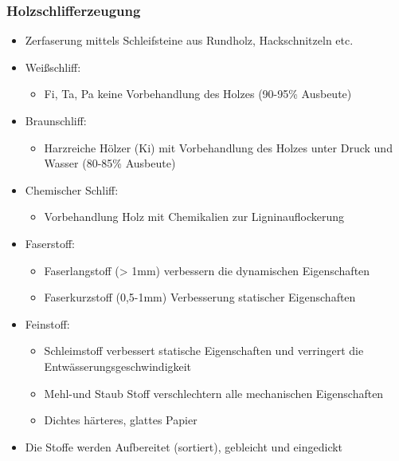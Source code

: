 \documentclass{article}
\begin{document}
\subsubsection{Holzschlifferzeugung}
\begin{itemize}
  \item Zerfaserung mittels Schleifsteine aus Rundholz, Hackschnitzeln etc.
  \item Weißschliff:
  \begin{itemize}
    \item Fi, Ta, Pa keine Vorbehandlung des Holzes (90-95\% Ausbeute)
  \end{itemize}
  \item Braunschliff:
  \begin{itemize}
    \item Harzreiche Hölzer (Ki) mit Vorbehandlung des Holzes unter Druck und
    Wasser (80-85\% Ausbeute)
  \end{itemize}
  \item Chemischer Schliff:
  \begin{itemize}
    \item Vorbehandlung Holz mit Chemikalien zur Ligninauflockerung
  \end{itemize}
  \item Faserstoff:
  \begin{itemize}
    \item Faserlangstoff (> 1mm) verbessern die dynamischen Eigenschaften
    \item Faserkurzstoff (0,5-1mm) Verbesserung statischer Eigenschaften
  \end{itemize}
  \item Feinstoff:
  \begin{itemize}
    \item Schleimstoff verbessert statische Eigenschaften und verringert die
    Entwässerungsgeschwindigkeit
    \item Mehl-und Staub Stoff verschlechtern alle mechanischen Eigenschaften
    \item Dichtes härteres, glattes Papier 
  \end{itemize}
  \item Die Stoffe werden Aufbereitet (sortiert), gebleicht und eingedickt
\end{itemize}
\end{document}
